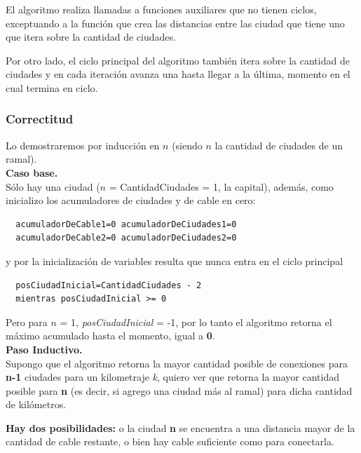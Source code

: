 \documentclass[spanish,a4paper]{article}
\begin{document}
El algoritmo realiza llamadas a funciones auxiliares que no tienen ciclos, exceptuando a la función que crea las distancias entre las ciudad que tiene uno que itera sobre la cantidad de ciudades. 

Por otro lado, el ciclo principal del algoritmo también itera sobre la cantidad de ciudades y en cada iteración avanza una hasta llegar a la última, momento en el cual termina en ciclo.

\subsubsection{Correctitud}

Lo demostraremos por inducción en $n$ (siendo $n$ la cantidad de ciudades de un ramal). \\

\textbf{Caso base.} \\

Sólo hay una ciudad ($n$ = CantidadCiudades = 1, la capital), además, como inicializo los acumuladores de ciudades y de cable en cero: 

\begin{lstlisting}
  acumuladorDeCable1=0 acumuladorDeCiudades1=0
  acumuladorDeCable2=0 acumuladorDeCiudades2=0          
\end{lstlisting}

y por la inicialización de variables resulta que nunca entra en el ciclo principal

\begin{lstlisting}
  posCiudadInicial=CantidadCiudades - 2
  mientras posCiudadInicial >= 0 
\end{lstlisting}

Pero para $n$ = 1, \textsl{posCiudadInicial} = -1, por lo tanto el algoritmo retorna el máximo acumulado hasta el momento, igual a \textbf{0}. \\

\textbf{Paso Inductivo.} \\

Supongo que el algoritmo retorna la mayor cantidad posible de conexiones para \textbf{n-1} ciudades para un kilometraje \textsl{k}, quiero ver que retorna la mayor cantidad posible para \textbf{n} (es decir, si agrego una ciudad más al ramal) para dicha cantidad de kilómetros.

\textbf{Hay dos posibilidades:} o la ciudad \textbf{n} se encuentra a una distancia mayor de la cantidad de cable restante, o bien hay cable suficiente como para conectarla. \\
\end{document}
